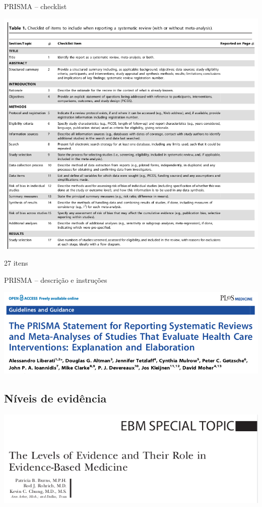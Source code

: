 \documentclass{beamer}
\begin{document}
\begin{frame}{PRISMA -- checklist}
  \begin{center}
    \includegraphics[height=.8\textheight]{Metodos/PRISMA-checklist}

    \bigskip
    \vfill
    \tiny
    27 itens
  \end{center}
\end{frame}

\begin{frame}{PRISMA -- descrição e instruções}
  \begin{center}
    \includegraphics[width=\textwidth]{Metodos/PRISMA-tit}
  \end{center}
\end{frame}

\subsection{Níveis de evidência}

\begin{frame}
  \begin{center}
    \includegraphics[width=1.1\textwidth]{Metodos/ebm-tit}
  \end{center}
\end{frame}
\end{document}
